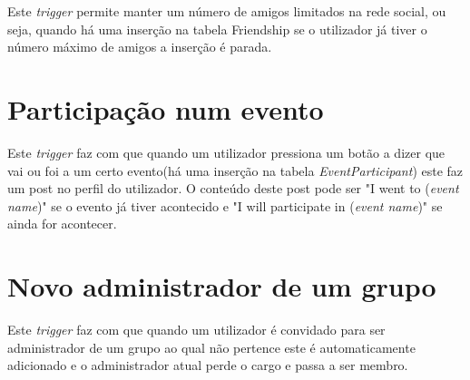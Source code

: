 \documentclass[12pt]{report}
\begin{document}
Este \textit{trigger} permite manter um número de amigos limitados na rede social, ou seja, quando há uma inserção na tabela Friendship se o utilizador já tiver o número máximo de amigos a inserção é parada.

\section{Participação num evento}

Este \textit{trigger} faz com que quando um utilizador pressiona um botão a dizer que vai ou foi a um certo evento(há uma inserção na tabela \textit{EventParticipant}) este faz um post no perfil do utilizador. O conteúdo deste post pode ser "I went to (\textit{event name})" se o evento já tiver acontecido e "I will participate in (\textit{event name})" se ainda for acontecer.

\section{Novo administrador de um grupo}

Este \textit{trigger} faz com que quando um utilizador é convidado para ser administrador de um grupo ao qual não pertence este é automaticamente adicionado e o administrador atual perde o cargo e passa a ser membro.
\end{document}
